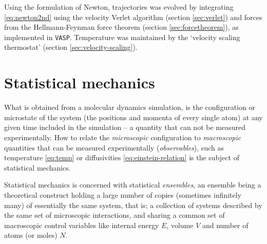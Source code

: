 \documentclass[11pt,bibliography=totoc,index=totoc]{scrbook}   %
\newcommand{\comment}[1]{\hl{#1}}
\newcommand{\vasp}{{\texttt{VASP}}} %
\begin{document}
Using the formulation of Newton, trajectories was evolved by integrating \eqref{eq:newton2nd} 
using the velocity Verlet algorithm (section \ref{sec:verlet}) and forces from the Hellmann-Feynman force theorem 
(section \ref{sec:forcetheorem}), as implemented in {\vasp}.
Temperature was maintained by the `velocity scaling thermostat' (section \ref{sec:velocity-scaling}).


%
\section{Statistical mechanics}\label{sec:statistical-mechanics}
%

What is obtained from a molecular dynamics simulation, is the configuration or microstate of the system (the positions and momenta of every single atom) at any given time included in the simulation -- a quantity that can not be measured experimentally. 
How to relate the \emph{microscopic} configuration to \emph{macroscopic} quantities that can be 
measured experimentally (\emph{observables}), 
such as temperature \eqref{eq:temp} or diffusivities \eqref{eq:einstein-relation} is the subject of statistical mechanics.

Statistical mechanics is concerned with statistical \emph{ensembles}, 
an ensemble being a theoretical construct holding a large number of copies (sometimes infinitely many) of essentially the same system, that is; 
a collection of systems described by the same set of microscopic interactions, and sharing a 
common set of macroscopic control variables like internal energy $E$, volume $V$ and number of atoms (or moles) $N$.\cite[63]{Tuckerman:2010}
\end{document}
